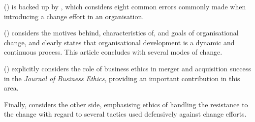 \citeauthor{luftman:managing-the-information-technology-resource:2009} (\citeyear{luftman:managing-the-information-technology-resource:2009}) is backed up by \autocites{kotter:leading-change-why-transformation-efforts-fail:1995}, which considers eight common errors commonly made when introducing a change effort in an organisation.

\citeauthor{peng-liu-tao:analyzing-the-pathway-of-organizational-change-based-on-the-environmental-complexity} (\citeyear{peng-liu-tao:analyzing-the-pathway-of-organizational-change-based-on-the-environmental-complexity}) considers the motives behind, characteristics of, and goals of organisational change, and clearly states that organisational development is a dynamic and continuous process. This article concludes with several modes of change.

\citeauthor{lin-wei:the-role-of-business-ethics-in-merger-and-acquisition-success:2006} (\citeyear{lin-wei:the-role-of-business-ethics-in-merger-and-acquisition-success:2006}) explicitly considers the role of business ethics in merger and acquisition success in the \textit{Journal of Business Ethics}, providing an important contribution in this area.

Finally, \autocite{mcgee:some-overlooked-ethical-issues-in-acquisitions-and-mergers:2004} considers the other side, emphasising ethics of handling the resistance to the change with regard to several tactics used defensively against change efforts.
